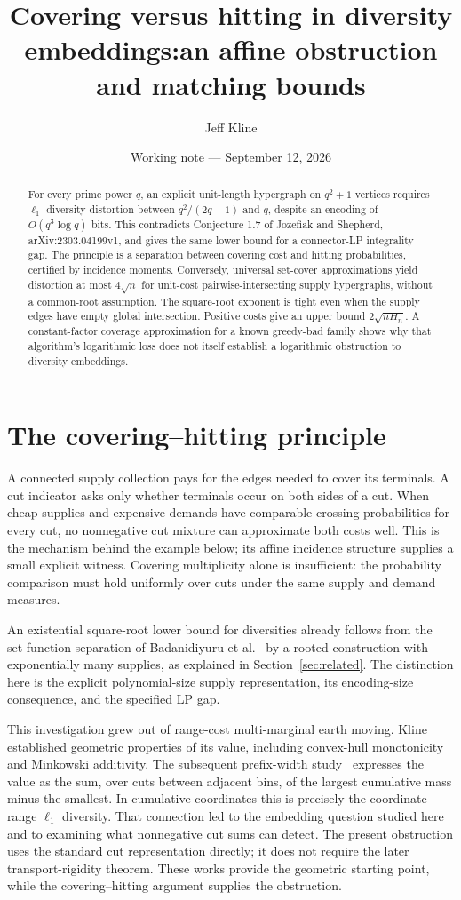 \documentclass[11pt]{article}
\title{Covering versus hitting in diversity embeddings:\newline an affine obstruction and matching bounds}
\author{Jeff Kline}
\date{Working note --- September 12, 2026}
\begin{document}
\maketitle
\begin{abstract}
For every prime power $q$, an explicit unit-length hypergraph on $q^2+1$
vertices requires $\ell_1$ diversity distortion between $q^2/(2q-1)$ and $q$,
despite an encoding of $O(q^3\log q)$ bits. This contradicts Conjecture 1.7
of Jozefiak and Shepherd, arXiv:2303.04199v1, and gives the same lower bound
for a connector-LP integrality gap. The principle is a separation between
covering cost and hitting probabilities, certified by incidence moments.
Conversely, universal set-cover approximations yield distortion at most
$4\sqrt n$ for unit-cost pairwise-intersecting supply hypergraphs, without
a common-root assumption. The square-root exponent is tight even when
the supply edges have empty global intersection. Positive costs give an
upper bound $2\sqrt{nH_n}$. A constant-factor coverage approximation for a
known greedy-bad family shows why that algorithm's logarithmic loss does
not itself establish a logarithmic obstruction to diversity embeddings.
\end{abstract}

\section{The covering--hitting principle}
A connected supply collection pays for the edges needed to cover its
terminals. A cut indicator asks only whether terminals occur on both sides
of a cut. When cheap supplies and expensive demands have comparable
crossing probabilities for every cut, no nonnegative cut mixture can
approximate both costs well. This is the mechanism behind the example
below; its affine incidence structure supplies a small explicit witness.
Covering multiplicity alone is insufficient: the probability comparison
must hold uniformly over cuts under the same supply and demand measures.

An existential square-root lower bound for diversities already follows
from the set-function separation of Badanidiyuru et al.~\cite{SVF} by a
rooted construction with exponentially many supplies, as explained in
Section~\ref{sec:related}. The distinction here is the explicit polynomial-size
supply representation, its encoding-size consequence, and the specified LP gap.

This investigation grew out of range-cost multi-marginal earth moving.
Kline~\cite{K19} established geometric properties of its value, including
convex-hull monotonicity and Minkowski additivity. The subsequent prefix-width
study~\cite{K26} expresses the value as the sum, over cuts between adjacent
bins, of the largest cumulative mass minus the smallest. In cumulative
coordinates this is precisely the coordinate-range $\ell_1$ diversity.
That connection led to the embedding question studied here and to examining
what nonnegative cut sums can detect. The present obstruction uses the
standard cut representation directly; it does not require the later
transport-rigidity theorem. These works provide the geometric starting
point, while the covering--hitting argument supplies the obstruction.
\end{document}
